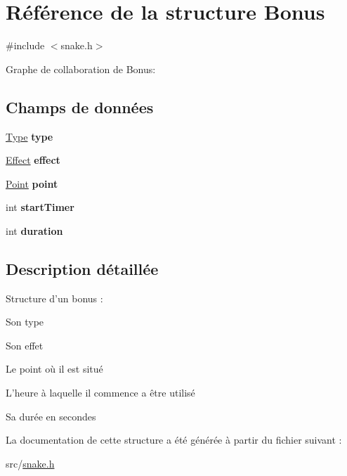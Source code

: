 \hypertarget{struct_bonus}{\section{Référence de la structure Bonus}
\label{struct_bonus}
}


{\ttfamily \#include $<$snake.\-h$>$}



Graphe de collaboration de Bonus\-:
\subsection*{Champs de données}
\begin{DoxyCompactItemize}
\item 
\hypertarget{struct_bonus_ab6f4e6d3fde00ce906e46494f60dfe7a}{\hyperlink{snake_8h_a1d1cfd8ffb84e947f82999c682b666a7}{Type} {\bfseries type}}\label{struct_bonus_ab6f4e6d3fde00ce906e46494f60dfe7a}

\item 
\hypertarget{struct_bonus_ab5e7dc19af149a6a7d49aa6d732e5e41}{\hyperlink{snake_8h_acd9c2a1cf576f0fd9da232d337d9720c}{Effect} {\bfseries effect}}\label{struct_bonus_ab5e7dc19af149a6a7d49aa6d732e5e41}

\item 
\hypertarget{struct_bonus_afa95e3c7f6220a97484f80f2726b5eb5}{\hyperlink{struct_point}{Point} {\bfseries point}}\label{struct_bonus_afa95e3c7f6220a97484f80f2726b5eb5}

\item 
\hypertarget{struct_bonus_aa13eab873d3b9ddb6e6b5e1fdade1a0b}{int {\bfseries start\-Timer}}\label{struct_bonus_aa13eab873d3b9ddb6e6b5e1fdade1a0b}

\item 
\hypertarget{struct_bonus_ac6e4b2a3cf932b33832d4e4e4e7cd0de}{int {\bfseries duration}}\label{struct_bonus_ac6e4b2a3cf932b33832d4e4e4e7cd0de}

\end{DoxyCompactItemize}


\subsection{Description détaillée}
Structure d'un bonus \-:
\begin{DoxyItemize}
\item Son type
\item Son effet
\item Le point où il est situé
\item L'heure à laquelle il commence a être utilisé
\item Sa durée en secondes 
\end{DoxyItemize}

La documentation de cette structure a été générée à partir du fichier suivant \-:\begin{DoxyCompactItemize}
\item 
src/\hyperlink{snake_8h}{snake.\-h}\end{DoxyCompactItemize}
